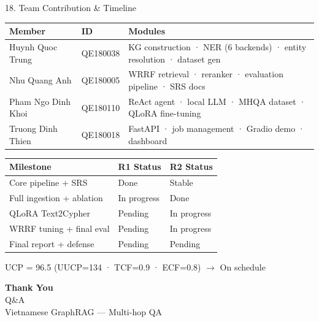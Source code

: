 \documentclass[aspectratio=169]{beamer}
\newcommand{\pos}[1]{\textcolor{positive}{#1}}
\newcommand{\con}[1]{\textcolor{negative}{#1}}
\begin{document}
\begin{frame}[shrink=5]{18. Team Contribution \& Timeline}
\begin{tabular}{@{}llp{6.0cm}@{}}
\toprule
\textbf{Member} & \textbf{ID} & \textbf{Modules} \\
\midrule
Huynh Quoc Trung   & QE180038 & KG construction · NER (6 backends) · entity resolution · dataset gen \\
Nhu Quang Anh      & QE180005 & WRRF retrieval · reranker · evaluation pipeline · SRS docs \\
Pham Ngo Dinh Khoi & QE180110 & ReAct agent · local LLM · MHQA dataset · QLoRA fine-tuning \\
Truong Dinh Thien  & QE180018 & FastAPI · job management · Gradio demo · dashboard \\
\bottomrule
\end{tabular}

\vspace{4pt}
\begin{tabular}{@{}lll@{}}
\toprule
\textbf{Milestone} & \textbf{R1 Status} & \textbf{R2 Status} \\
\midrule
Core pipeline + SRS        & \pos{Done \checkmark}  & \pos{Stable \checkmark} \\
Full ingestion + ablation  & \con{In progress}      & \pos{Done \checkmark} \\
QLoRA Text2Cypher          & Pending                & \con{In progress} \\
WRRF tuning + final eval   & Pending                & \con{In progress} \\
Final report + defense     & Pending                & Pending \\
\bottomrule
\end{tabular}

\begin{block}{}
{\small UCP = 96.5 (UUCP=134 · TCF=0.9 · ECF=0.8) $\rightarrow$ On schedule \pos{\checkmark}}
\end{block}
\end{frame}

\begin{frame}[plain]
\begin{center}
{\Huge \textbf{Thank You}}\\[12pt]
{\Large Q\&A}\\[8pt]
{\normalsize Vietnamese GraphRAG --- Multi-hop QA}
\end{center}
\end{frame}
\end{document}
